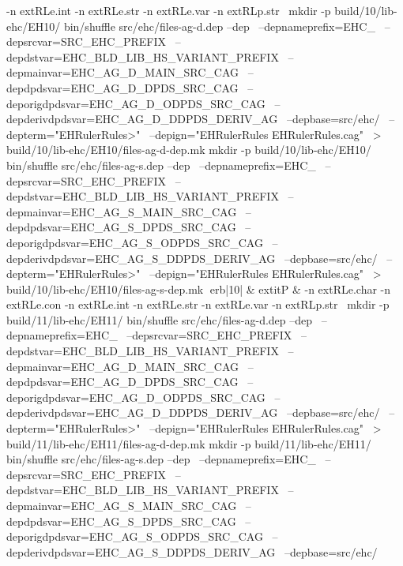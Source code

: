 -n 	extRL{e.int}\hspace{.5em} 
-n 	extRL{e.str}\hspace{.5em} 
-n 	extRL{e.var}\hspace{.5em} 
-n 	extRL{p.str}\hspace{.5em} 
\
mkdir -p build/10/lib-ehc/EH10/
bin/shuffle src/ehc/files-ag-d.dep --dep \
	  --depnameprefix=EHC_ \
	  --depsrcvar=SRC_EHC_PREFIX \
	  --depdstvar=EHC_BLD_LIB_HS_VARIANT_PREFIX \
	  --depmainvar=EHC_AG_D_MAIN_SRC_CAG \
	  --depdpdsvar=EHC_AG_D_DPDS_SRC_CAG \
	  --deporigdpdsvar=EHC_AG_D_ODPDS_SRC_CAG \
	  --depderivdpdsvar=EHC_AG_D_DDPDS_DERIV_AG \
	  --depbase=src/ehc/ \
	  --depterm="EHRulerRules>" \
	  --depign="EHRulerRules EHRulerRules.cag" \
	    > build/10/lib-ehc/EH10/files-ag-d-dep.mk
mkdir -p build/10/lib-ehc/EH10/
bin/shuffle src/ehc/files-ag-s.dep --dep \
	  --depnameprefix=EHC_ \
	  --depsrcvar=SRC_EHC_PREFIX \
	  --depdstvar=EHC_BLD_LIB_HS_VARIANT_PREFIX \
	  --depmainvar=EHC_AG_S_MAIN_SRC_CAG \
	  --depdpdsvar=EHC_AG_S_DPDS_SRC_CAG \
	  --deporigdpdsvar=EHC_AG_S_ODPDS_SRC_CAG \
	  --depderivdpdsvar=EHC_AG_S_DDPDS_DERIV_AG \
	  --depbase=src/ehc/ \
	  --depterm="EHRulerRules>" \
	  --depign="EHRulerRules EHRulerRules.cag" \
	    > build/10/lib-ehc/EH10/files-ag-s-dep.mk
erb|10| & 	extit{P} & 
-n 	extRL{e.char}\hspace{.5em} 
-n 	extRL{e.con}\hspace{.5em} 
-n 	extRL{e.int}\hspace{.5em} 
-n 	extRL{e.str}\hspace{.5em} 
-n 	extRL{e.var}\hspace{.5em} 
-n 	extRL{p.str}\hspace{.5em} 
\
mkdir -p build/11/lib-ehc/EH11/
bin/shuffle src/ehc/files-ag-d.dep --dep \
	  --depnameprefix=EHC_ \
	  --depsrcvar=SRC_EHC_PREFIX \
	  --depdstvar=EHC_BLD_LIB_HS_VARIANT_PREFIX \
	  --depmainvar=EHC_AG_D_MAIN_SRC_CAG \
	  --depdpdsvar=EHC_AG_D_DPDS_SRC_CAG \
	  --deporigdpdsvar=EHC_AG_D_ODPDS_SRC_CAG \
	  --depderivdpdsvar=EHC_AG_D_DDPDS_DERIV_AG \
	  --depbase=src/ehc/ \
	  --depterm="EHRulerRules>" \
	  --depign="EHRulerRules EHRulerRules.cag" \
	    > build/11/lib-ehc/EH11/files-ag-d-dep.mk
mkdir -p build/11/lib-ehc/EH11/
bin/shuffle src/ehc/files-ag-s.dep --dep \
	  --depnameprefix=EHC_ \
	  --depsrcvar=SRC_EHC_PREFIX \
	  --depdstvar=EHC_BLD_LIB_HS_VARIANT_PREFIX \
	  --depmainvar=EHC_AG_S_MAIN_SRC_CAG \
	  --depdpdsvar=EHC_AG_S_DPDS_SRC_CAG \
	  --deporigdpdsvar=EHC_AG_S_ODPDS_SRC_CAG \
	  --depderivdpdsvar=EHC_AG_S_DDPDS_DERIV_AG \
	  --depbase=src/ehc/ \
